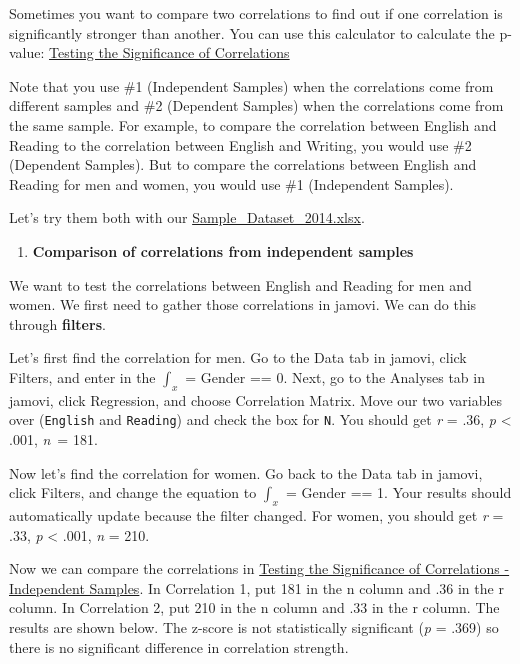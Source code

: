 \documentclass[
]{book}
\providecommand{\tightlist}{%
  \setlength{\itemsep}{0pt}\setlength{\parskip}{0pt}}
\begin{document}
Sometimes you want to compare two correlations to find out if one correlation is significantly stronger than another. You can use this calculator to calculate the p-value: \href{https://www.psychometrica.de/correlation.html}{Testing the Significance of Correlations}

Note that you use \#1 (Independent Samples) when the correlations come from different samples and \#2 (Dependent Samples) when the correlations come from the same sample. For example, to compare the correlation between English and Reading to the correlation between English and Writing, you would use \#2 (Dependent Samples). But to compare the correlations between English and Reading for men and women, you would use \#1 (Independent Samples).

Let's try them both with our \href{https://github.com/danawanzer/stats-with-jamovi/blob/master/data/Sample_Dataset_2014.xlsx}{Sample\_Dataset\_2014.xlsx}.

\begin{enumerate}
\def\labelenumi{\arabic{enumi}.}
\tightlist
\item
  \textbf{Comparison of correlations from independent samples}
\end{enumerate}

We want to test the correlations between English and Reading for men and women. We first need to gather those correlations in jamovi. We can do this through \textbf{filters}.

Let's first find the correlation for men. Go to the Data tab in jamovi, click Filters, and enter in the \(\int_x\) = Gender == 0. Next, go to the Analyses tab in jamovi, click Regression, and choose Correlation Matrix. Move our two variables over (\texttt{English} and \texttt{Reading}) and check the box for \texttt{N}. You should get \emph{r} = .36, \emph{p} \textless{} .001, \emph{n}~= 181.

Now let's find the correlation for women. Go back to the Data tab in jamovi, click Filters, and change the equation to \(\int_x\) = Gender == 1. Your results should automatically update because the filter changed. For women, you should get \emph{r} = .33, \emph{p} \textless{} .001, \emph{n} = 210.

Now we can compare the correlations in \href{https://www.psychometrica.de/correlation.html\#independent}{Testing the Significance of Correlations - Independent Samples}. In Correlation 1, put 181 in the n column and .36 in the r column. In Correlation 2, put 210 in the n column and .33 in the r column. The results are shown below. The z-score is not statistically significant (\emph{p} = .369) so there is no significant difference in correlation strength.
\end{document}
